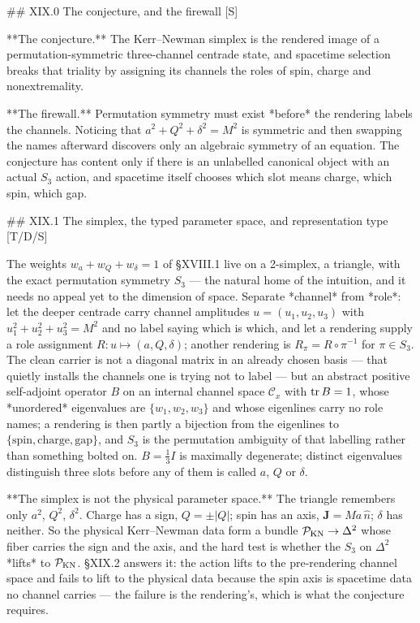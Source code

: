 ## XIX.0 The conjecture, and the firewall [S]

**The conjecture.** The Kerr–Newman simplex is the rendered image of a permutation-symmetric three-channel centrade state, and spacetime selection breaks that triality by assigning its channels the roles of spin, charge and nonextremality.

**The firewall.** Permutation symmetry must exist *before* the rendering labels the channels. Noticing that $a^2+Q^2+\delta^2 = M^2$ is symmetric and then swapping the names afterward discovers only an algebraic symmetry of an equation. The conjecture has content only if there is an unlabelled canonical object with an actual $S_3$ action, and spacetime itself chooses which slot means charge, which spin, which gap.

## XIX.1 The simplex, the typed parameter space, and representation type [T/D/S]

The weights $w_a+w_Q+w_\delta = 1$ of §XVIII.1 live on a 2-simplex, a triangle, with the exact permutation symmetry $S_3$ — the natural home of the intuition, and it needs no appeal yet to the dimension of space. Separate *channel* from *role*: let the deeper centrade carry channel amplitudes $u = (u_1,u_2,u_3)$ with $u_1^2+u_2^2+u_3^2 = M^2$ and no label saying which is which, and let a rendering supply a role assignment $R:u\mapsto(a,Q,\delta)$; another rendering is $R_\pi = R\circ\pi^{-1}$ for $\pi\in S_3$. The clean carrier is not a diagonal matrix in an already chosen basis — that quietly installs the channels one is trying not to label — but an abstract positive self-adjoint operator $B$ on an internal channel space $\mathcal C_x$ with ${\rm tr}\,B = 1$, whose *unordered* eigenvalues are $\{w_1,w_2,w_3\}$ and whose eigenlines carry no role names; a rendering is then partly a bijection from the eigenlines to $\{\text{spin},\text{charge},\text{gap}\}$, and $S_3$ is the permutation ambiguity of that labelling rather than something bolted on. $B = \tfrac13I$ is maximally degenerate; distinct eigenvalues distinguish three slots before any of them is called $a$, $Q$ or $\delta$.

**The simplex is not the physical parameter space.** The triangle remembers only $a^2$, $Q^2$, $\delta^2$. Charge has a sign, $Q = \pm|Q|$; spin has an axis, $\mathbf J = Ma\,\hat n$; $\delta$ has neither. So the physical Kerr–Newman data form a bundle $\mathcal P_{\rm KN}\to\Delta^2$ whose fiber carries the sign and the axis, and the hard test is whether the $S_3$ on $\Delta^2$ *lifts* to $\mathcal P_{\rm KN}$. §XIX.2 answers it: the action lifts to the pre-rendering channel space and fails to lift to the physical data because the spin axis is spacetime data no channel carries — the failure is the rendering's, which is what the conjecture requires.

